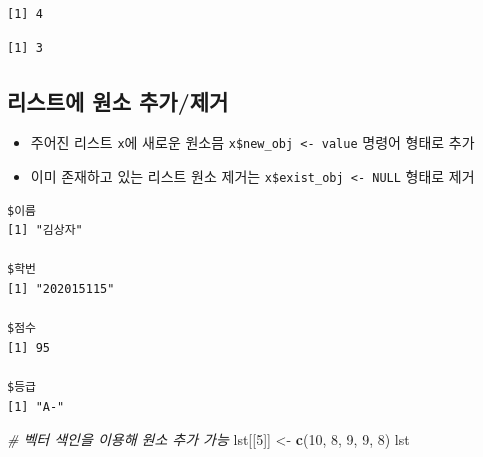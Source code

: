 \documentclass[
  11pt,
]{krantz}
\newenvironment{Shaded}{\begin{snugshade}}{\end{snugshade}}
\newcommand{\CommentTok}[1]{\textcolor[rgb]{0.37,0.37,0.37}{\textit{#1}}}
\newcommand{\DecValTok}[1]{\textcolor[rgb]{0.06,0.06,0.06}{#1}}
\newcommand{\KeywordTok}[1]{\textcolor[rgb]{0.27,0.27,0.27}{\textbf{#1}}}
\newcommand{\NormalTok}[1]{#1}
\newcommand{\OperatorTok}[1]{\textcolor[rgb]{0.43,0.43,0.43}{\textbf{#1}}}
\newcommand{\OtherTok}[1]{\textcolor[rgb]{0.37,0.37,0.37}{#1}}
\newcommand{\StringTok}[1]{\textcolor[rgb]{0.5,0.5,0.5}{#1}}
\providecommand{\tightlist}{%
  \setlength{\itemsep}{0pt}\setlength{\parskip}{0pt}}
\begin{document}
\begin{verbatim}
[1] 4
\end{verbatim}

\begin{verbatim}
[1] 3
\end{verbatim}

\normalsize

\hypertarget{list-add-delete}{%
\subsection{리스트에 원소 추가/제거}\label{list-add-delete}}

\begin{itemize}
\tightlist
\item
  주어진 리스트 \texttt{x}에 새로운 원소믐 \texttt{x\$new\_obj\ \textless{}-\ value} 명령어 형태로 추가
\item
  이미 존재하고 있는 리스트 원소 제거는 \texttt{x\$exist\_obj\ \textless{}-\ NULL} 형태로 제거
\end{itemize}

\footnotesize

\begin{Shaded}
\end{Shaded}

\begin{verbatim}
$이름
[1] "김상자"

$학번
[1] "202015115"

$점수
[1] 95

$등급
[1] "A-"
\end{verbatim}

\begin{Shaded}
\begin{Highlighting}[]
\CommentTok{# 벡터 색인을 이용해 원소 추가 가능}
\NormalTok{lst[[}\DecValTok{5}\NormalTok{]] <-}\StringTok{ }\KeywordTok{c}\NormalTok{(}\DecValTok{10}\NormalTok{, }\DecValTok{8}\NormalTok{, }\DecValTok{9}\NormalTok{, }\DecValTok{9}\NormalTok{, }\DecValTok{8}\NormalTok{)}
\NormalTok{lst}
\end{Highlighting}
\end{Shaded}
\end{document}
